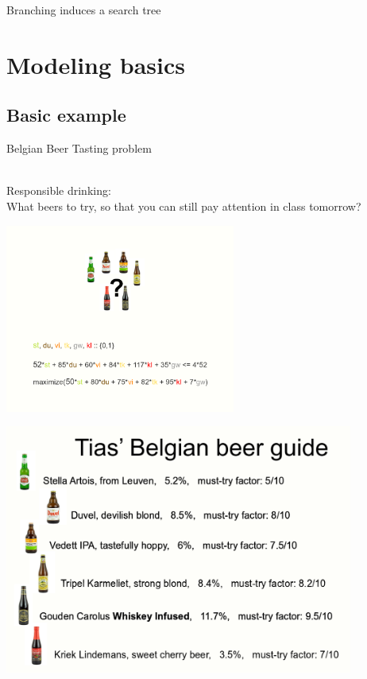 \documentclass{cons-beamer}
\begin{document}
\begin{frame}{Branching induces a search tree}

\end{frame}


\section{Modeling basics}

\subsection{Basic example}

\begin{frame}{Belgian Beer Tasting problem}

  $ $\\
  Responsible drinking:\\
  What beers to try, so that you can still pay attention in class tomorrow?

  \begin{center}
    \includegraphics[height=62mm, trim=0 100mm 0 0, clip]{images/beer_taste_prob.png}
  \end{center}
\end{frame}

\begin{frame}
  \centering
  \includegraphics[height=82mm]{images/beer_guide.png}
\end{frame}
\end{document}
